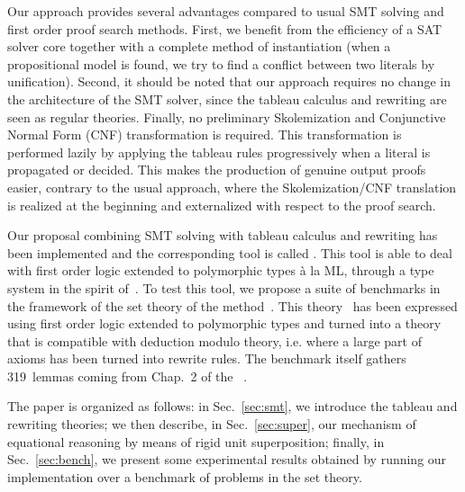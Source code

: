Our approach provides several advantages compared to usual SMT solving and first
order proof search methods. First, we benefit from the efficiency of a SAT
solver core together with a complete method of instantiation (when a
propositional model is found, we try to find a conflict between two literals by
unification). Second, it should be noted that our approach requires no change in
the architecture of the SMT solver, since the tableau calculus and rewriting are
seen as regular theories. Finally, no preliminary Skolemization and Conjunctive
Normal Form (CNF) transformation is required. This transformation is performed
lazily by applying the tableau rules progressively when a literal is propagated
or decided. This makes the production of genuine output proofs easier, contrary
to the usual approach, where the Skolemization/CNF translation is realized at
the beginning and externalized with respect to the proof search.

Our proposal combining SMT solving with tableau calculus and rewriting has been
implemented and the corresponding tool is called \archsat{}. This tool is able
to deal with first order logic extended to polymorphic types à la ML, through a
type system in the spirit of~\cite{BP13}. To test this tool, we propose a
suite of benchmarks in the framework of the set theory of the \bmth{}
method~\cite{B-Book}. This theory~\cite{BA15} has been expressed using first
order logic extended to polymorphic types and turned into a theory that is
compatible with deduction modulo theory, i.e. where a large part of axioms has
been turned into rewrite rules. The benchmark itself gathers 319~lemmas coming
from Chap.~2 of the \bbook{}~\cite{B-Book}.

The paper is organized as follows: in Sec.~\ref{sec:smt}, we introduce the tableau
and rewriting theories; we then describe, in Sec.~\ref{sec:super}, our mechanism
of equational reasoning by means of rigid unit superposition; finally, in
Sec.~\ref{sec:bench}, we present some experimental results obtained by running
our implementation over a benchmark of problems in the \bmth{} set theory.
